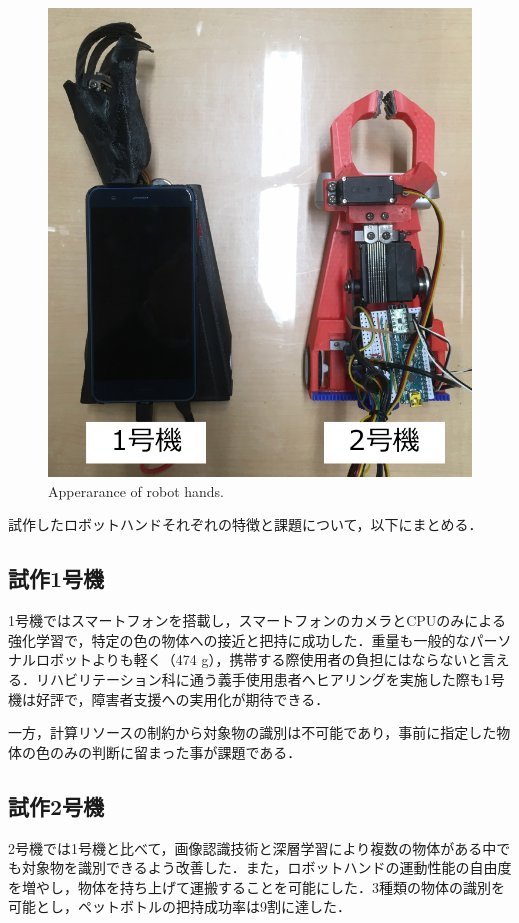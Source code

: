 \begin{figure}[H]
\begin{minipage}{0.32\hsize}
        \includegraphics[width=\linewidth]{figure/chapter5/ロボットハンドまとめ上}
    \end{minipage}
    \caption{Apperarance of robot hands.}
    \label{fig:ロボットハンドまとめ}
\end{figure}
試作したロボットハンドそれぞれの特徴と課題について，以下にまとめる．

\subsection*{試作1号機}
1号機ではスマートフォンを搭載し，スマートフォンのカメラとCPUのみによる強化学習で，特定の色の物体への接近と把持に成功した．重量も一般的なパーソナルロボットよりも軽く（474 g），携帯する際使用者の負担にはならないと言える．リハビリテーション科に通う義手使用患者へヒアリングを実施した際も1号機は好評で，障害者支援への実用化が期待できる．

一方，計算リソースの制約から対象物の識別は不可能であり，事前に指定した物体の色のみの判断に留まった事が課題である．

\subsection*{試作2号機}
2号機では1号機と比べて，画像認識技術と深層学習により複数の物体がある中でも対象物を識別できるよう改善した．また，ロボットハンドの運動性能の自由度を増やし，物体を持ち上げて運搬することを可能にした．3種類の物体の識別を可能とし，ペットボトルの把持成功率は9割に達した．

